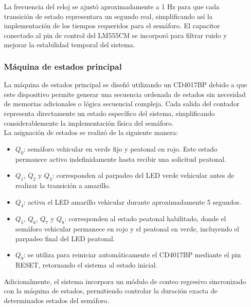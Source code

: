 \documentclass[12pt, journal, onecolumn]{IEEEtran}
\begin{document}
La frecuencia del reloj se ajustó aproximadamente a 1 Hz para que cada transición de estado representara un segundo real, simplificando así la implementación de los tiempos requeridos para el semáforo. El capacitor conectado al pin de control del LM555CM se incorporó para filtrar ruido y mejorar la estabilidad temporal del sistema.\\

\subsubsection{\textbf{Máquina de estados principal}}
La máquina de estados principal se diseñó utilizando un CD4017BP debido a que este dispositivo permite generar una secuencia ordenada de estados sin necesidad de memorias adicionales o lógica secuencial compleja. Cada salida del contador representa directamente un estado específico del sistema, simplificando considerablemente la implementación física del semáforo.\\

La asignación de estados se realizó de la siguiente manera:

\begin{itemize}
    \item $Q_0$: semáforo vehicular en verde fijo y peatonal en rojo. Este estado permanece activo indefinidamente hasta recibir una solicitud peatonal.
    
    \item $Q_1$, $Q_2$ y $Q_3$: corresponden al parpadeo del LED verde vehicular antes de realizar la transición a amarillo.
    
    \item $Q_4$: activa el LED amarillo vehicular durante aproximadamente 5 segundos.
    
    \item $Q_5$, $Q_6$, $Q_7$ y $Q_8$: corresponden al estado peatonal habilitado, donde el semáforo vehicular permanece en rojo y el peatonal en verde, incluyendo el parpadeo final del LED peatonal.
    
    \item $Q_9$: se utiliza para reiniciar automáticamente el CD4017BP mediante el pin RESET, retornando el sistema al estado inicial.
\end{itemize}

Adicionalmente, el sistema incorpora un módulo de conteo regresivo sincronizado con la máquina de estados, permitiendo controlar la duración exacta de determinados estados del semáforo.\\
\end{document}
